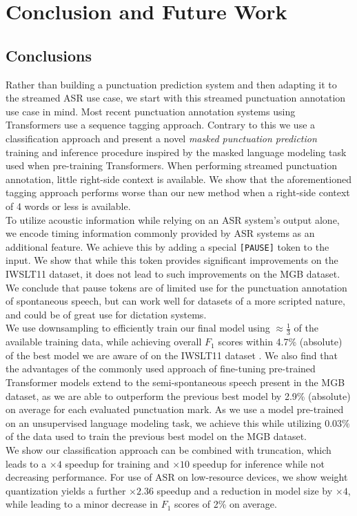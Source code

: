 \documentclass[bsc,deptreport,ai]{infthesis} %
\begin{document}
\chapter{Conclusion and Future Work}

\section{Conclusions}
Rather than building a punctuation prediction system and then adapting it to the streamed ASR use case, we start with this streamed punctuation annotation use case in mind. Most recent punctuation annotation systems using Transformers use a sequence tagging approach. Contrary to this we use a classification approach and present a novel \emph{masked punctuation prediction} training and inference procedure inspired by the masked language modeling task \citep{devlin2019bert} used when pre-training Transformers. When performing streamed punctuation annotation, little right-side context is available. We show that the aforementioned tagging approach performs worse than our new method when a right-side context of 4 words or less is available. \\
To utilize acoustic information while relying on an ASR system's output alone, we encode timing information commonly provided by ASR systems as an additional feature. We achieve this by adding a special \texttt{[PAUSE]} token to the input. We show that while this token provides significant improvements on the IWSLT11 dataset, it does not lead to such improvements on the MGB dataset. We conclude that pause tokens are of limited use for the punctuation annotation of spontaneous speech, but can work well for datasets of a more scripted nature, and could be of great use for dictation systems.\\
We use downsampling to efficiently train our final model using $\approx\frac{1}{3}$ of the available training data, while achieving overall $F_1$ scores within 4.7\% (absolute) of the best model we are aware of on the IWSLT11 dataset \citep{sotapunctuation}. We also find that the advantages of the commonly used approach of fine-tuning pre-trained Transformer models extend to the semi-spontaneous speech present in the MGB dataset, as we are able to outperform the previous best model \citep{Klejch2016} by 2.9\% (absolute) on average for each evaluated punctuation mark. As we use a model pre-trained on an unsupervised language modeling task, we achieve this while utilizing 0.03\% of the data used to train the previous best model on the MGB dataset.\\
We show our classification approach can be combined with truncation, which leads to a $\times4$ speedup for training and $\times10$ speedup for inference while not decreasing performance. For use of ASR on low-resource devices, we show weight quantization yields a further $\times2.36$ speedup and a reduction in model size by $\times4$, while leading to a minor decrease in $F_1$ scores of 2\% on average.
\end{document}
